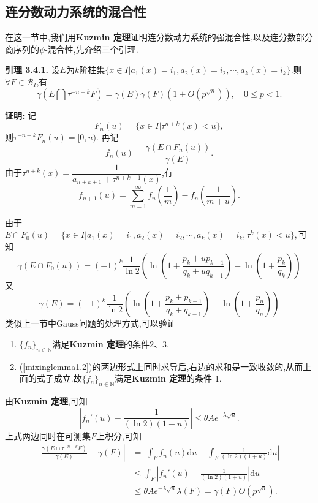 \subsection{连分数动力系统的混合性}
在这一节中,我们用\textbf{Kuzmin 定理}证明连分数动力系统的强混合性,以及连分数部分商序列的$\psi$-混合性,先介绍三个引理.\par
\textbf{引理 3.4.1.  }\textsuperscript{\cite{Liu_Peng,Mixing_lemma}}
设$E$为$k$阶柱集$\{x\in I|a_1(x)=i_1,a_2(x)=i_2,\cdots,a_k(x)=i_k\}$.则$\forall F\in\mathcal{B}_I$,有
\begin{equation}\label{mixinglemma1.1}
    \gamma(E\bigcap \tau^{-n-k}F)=\gamma(E)\gamma(F)(1+O(p^{\sqrt{n}})),\quad 0\leqslant p<1.
\end{equation}
\par
\textbf{证明:  }
记
$$F_n(u)=\{x\in I|\tau^{n+k}(x)<u\},$$
则$\tau^{-n-k}F_n(u)=[0,u).$
再记
$$f_n(u)=\dfrac{\gamma(E\cap F_n(u))}{\gamma(E)}.$$
由于$\tau^{n+k}(x)=\dfrac{1}{a_{n+k+1}+\tau^{n+k+1}(x)}$,有
\begin{equation}\label{mixinglemma1.2}
    f_{n+1}(u)=\sum_{m=1}^\infty f_{n}\left(\dfrac{1}{m}\right)-f_{n}\left(\dfrac{1}{m+u}\right).
\end{equation}\par
由于$E\cap F_0(u)=\{x\in I|a_1(x)=i_1,a_2(x)=i_2,\cdots,a_k(x)=i_k,\tau^{k}(x)<u\},$可知
$$\gamma(E\cap F_0(u))=(-1)^k\frac{1}{\ln2}\left(\ln\left(1+\frac{p_k+up_{k-1}}{q_k+uq_{k-1}}\right)-\ln\left(1+\frac{p_k}{q_k}\right)\right)$$
又
$$\gamma(E)=(-1)^k\frac{1}{\ln2}\left(\ln\left(1+\frac{p_k+p_{k-1}}{q_k+q_{k-1}}\right)-\ln\left(1+\frac{p_n}{q_n}\right)\right)$$
类似上一节中Gauss问题的处理方式,可以验证
\begin{enumerate}
    \item $\{f_n\}_{n\in\mathbb{N}}$满足\textbf{Kuzmin 定理}的条件2、3.
    \item (\ref{mixinglemma1.2})的两边形式上同时求导后,右边的求和是一致收敛的,从而上面的式子成立.故$\{f_n\}_{n\in\mathbb{N}}$满足\textbf{Kuzmin 定理}的条件 1.
\end{enumerate}\par
由\textbf{Kuzmin 定理},可知
$$|f_n'(u)-\frac{1}{(\ln 2)(1+u)}|\leqslant \theta A e^{-\lambda \sqrt{n}}.$$
上式两边同时在可测集$F$上积分,可知\\
\begin{align*}
    \left|\frac{\gamma(E\cap \tau^{-n-k}F)}{\gamma(E)}-\gamma(F)\right| & =\left|\int_F f_n(u)\mathrm{d}u-\int_F \frac{1}{(\ln 2)(1+u)}\mathrm{d}u\right| \\
                                                                        & \leqslant\int_F\left|f_n'(u)-\frac{1}{(\ln 2)(1+u)}\right|\mathrm{d}u           \\
                                                                        & \leqslant\theta A e^{-\lambda\sqrt{n}}\lambda(F)=\gamma(F)O(p^{\sqrt{n}}).
\end{align*}
